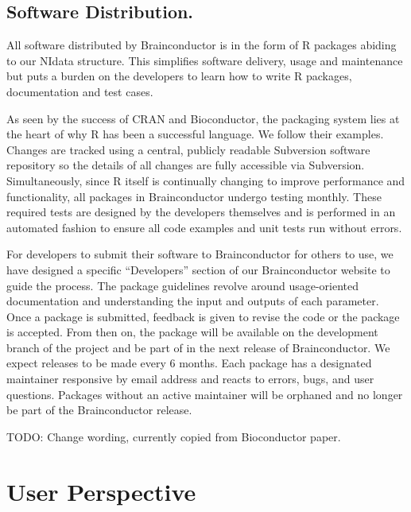 \documentclass{nature}
\begin{document}
\subsection{Software Distribution.}

All software distributed by Brainconductor is in the form of R packages abiding
to our NIdata structure. This
simplifies software delivery, usage and maintenance but puts a burden on the
developers
to learn how to write R packages, documentation and test cases.

As seen by the success of CRAN and Bioconductor, the packaging system lies
at the heart of why R has been a successful language. We follow their examples.
Changes are tracked using a central, publicly readable Subversion software
repository
so the details of all changes are fully accessible via Subversion.
Simultaneously, since
R itself is continually changing to improve performance and functionality, all
packages
in Brainconductor undergo testing monthly. These required tests are designed by
the
developers themselves and is performed in an automated fashion to ensure
all code examples and unit tests run without errors.

For developers to submit their software to Brainconductor for others to use,
we have designed a specific ``Developers'' section of our Brainconductor website
to guide the process. The package guidelines revolve around usage-oriented
documentation and understanding the input and outputs of each parameter.
 Once
a package is submitted, feedback is given to revise the code or the package is
accepted.
From then on, the package will be available on the
development branch of the project and be part of in the next release of
Brainconductor.
We expect releases to be made every 6 months.
Each package has a designated maintainer responsive by email address and reacts
to
errors, bugs, and user questions. Packages without an active maintainer will be
orphaned and no longer be part of the Brainconductor release.

{\color{red}TODO: Change wording, currently copied from Bioconductor paper.}



\section{User Perspective}
\end{document}
